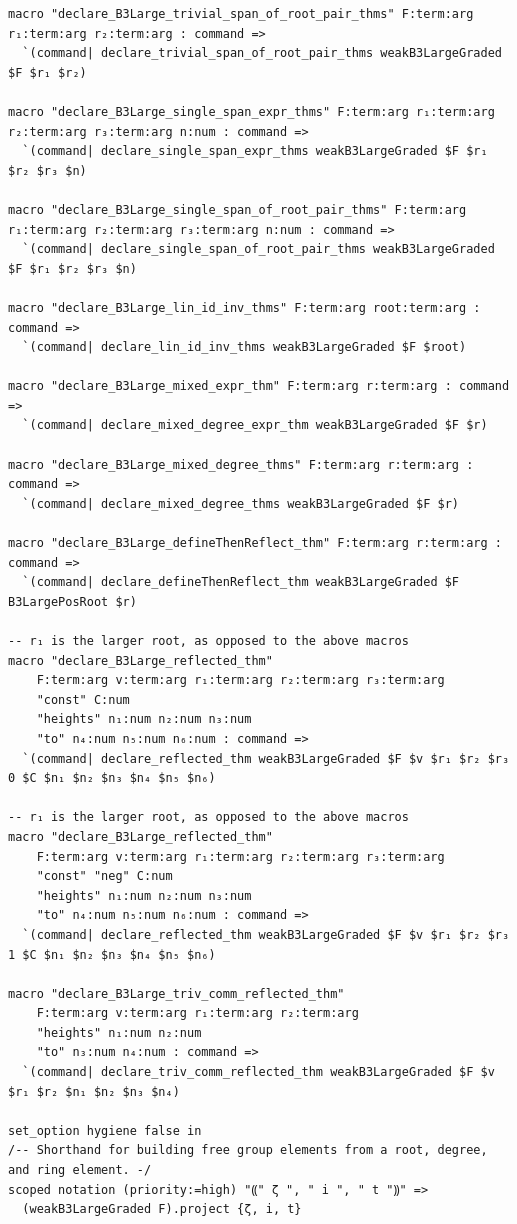 \begin{Verbatim}
macro "declare_B3Large_trivial_span_of_root_pair_thms" F:term:arg r₁:term:arg r₂:term:arg : command =>
  `(command| declare_trivial_span_of_root_pair_thms weakB3LargeGraded $F $r₁ $r₂)

macro "declare_B3Large_single_span_expr_thms" F:term:arg r₁:term:arg r₂:term:arg r₃:term:arg n:num : command =>
  `(command| declare_single_span_expr_thms weakB3LargeGraded $F $r₁ $r₂ $r₃ $n)

macro "declare_B3Large_single_span_of_root_pair_thms" F:term:arg r₁:term:arg r₂:term:arg r₃:term:arg n:num : command =>
  `(command| declare_single_span_of_root_pair_thms weakB3LargeGraded $F $r₁ $r₂ $r₃ $n)

macro "declare_B3Large_lin_id_inv_thms" F:term:arg root:term:arg : command =>
  `(command| declare_lin_id_inv_thms weakB3LargeGraded $F $root)

macro "declare_B3Large_mixed_expr_thm" F:term:arg r:term:arg : command =>
  `(command| declare_mixed_degree_expr_thm weakB3LargeGraded $F $r)

macro "declare_B3Large_mixed_degree_thms" F:term:arg r:term:arg : command =>
  `(command| declare_mixed_degree_thms weakB3LargeGraded $F $r)

macro "declare_B3Large_defineThenReflect_thm" F:term:arg r:term:arg : command =>
  `(command| declare_defineThenReflect_thm weakB3LargeGraded $F B3LargePosRoot $r)

-- r₁ is the larger root, as opposed to the above macros
macro "declare_B3Large_reflected_thm"
    F:term:arg v:term:arg r₁:term:arg r₂:term:arg r₃:term:arg
    "const" C:num
    "heights" n₁:num n₂:num n₃:num
    "to" n₄:num n₅:num n₆:num : command =>
  `(command| declare_reflected_thm weakB3LargeGraded $F $v $r₁ $r₂ $r₃ 0 $C $n₁ $n₂ $n₃ $n₄ $n₅ $n₆)

-- r₁ is the larger root, as opposed to the above macros
macro "declare_B3Large_reflected_thm"
    F:term:arg v:term:arg r₁:term:arg r₂:term:arg r₃:term:arg
    "const" "neg" C:num
    "heights" n₁:num n₂:num n₃:num
    "to" n₄:num n₅:num n₆:num : command =>
  `(command| declare_reflected_thm weakB3LargeGraded $F $v $r₁ $r₂ $r₃ 1 $C $n₁ $n₂ $n₃ $n₄ $n₅ $n₆)

macro "declare_B3Large_triv_comm_reflected_thm"
    F:term:arg v:term:arg r₁:term:arg r₂:term:arg
    "heights" n₁:num n₂:num
    "to" n₃:num n₄:num : command =>
  `(command| declare_triv_comm_reflected_thm weakB3LargeGraded $F $v $r₁ $r₂ $n₁ $n₂ $n₃ $n₄)

set_option hygiene false in
/-- Shorthand for building free group elements from a root, degree, and ring element. -/
scoped notation (priority:=high) "⸨" ζ ", " i ", " t "⸩" =>
  (weakB3LargeGraded F).project {ζ, i, t}


\end{Verbatim}
